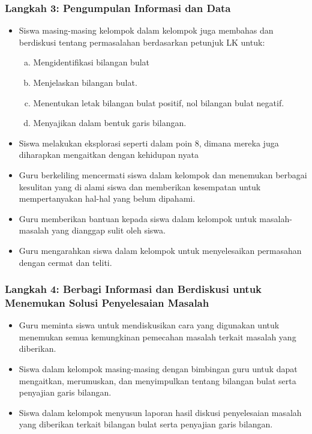 \documentclass[a5paper,10pt,openany]{book}
\begin{document}
\subsubsection{Langkah 3: Pengumpulan Informasi dan Data}
{\color{NavyBlue}
	\begin{itemize}[\faCheckSquare,leftmargin=*,itemsep=-4pt,topsep=2pt]	
		\item Siswa masing-masing kelompok dalam kelompok juga membahas dan berdiskusi tentang permasalahan berdasarkan petunjuk LK untuk:
		\begin{enumerate}[a.,leftmargin=*,itemsep=-4pt,topsep=2pt]
			\item Mengidentifikasi bilangan bulat
			\item Menjelaskan bilangan bulat.
			\item Menentukan letak bilangan bulat positif, nol bilangan bulat negatif.
			\item Menyajikan dalam bentuk garis bilangan.
		\end{enumerate}
		\item Siswa melakukan eksplorasi seperti dalam poin 8, dimana mereka juga diharapkan mengaitkan dengan kehidupan nyata 
		\item Guru berkeliling mencermati siswa dalam kelompok dan menemukan berbagai kesulitan yang di alami siswa dan  memberikan kesempatan untuk mempertanyakan hal-hal yang belum dipahami.
		\item Guru memberikan bantuan kepada siswa dalam kelompok untuk masalah-masalah yang dianggap sulit oleh siswa.
		\item Guru mengarahkan siswa dalam kelompok untuk menyelesaikan permasahan dengan cermat dan teliti.	
	\end{itemize}	
}	
\subsubsection{Langkah 4: Berbagi Informasi dan Berdiskusi untuk Menemukan Solusi Penyelesaian Masalah}
{\color{NavyBlue}
	\begin{itemize}[\faCheckSquare,leftmargin=*,itemsep=-4pt,topsep=2pt]	
	\item Guru meminta siswa untuk mendiskusikan cara yang digunakan untuk menemukan semua kemungkinan pemecahan masalah terkait masalah yang diberikan.
	\item Siswa dalam kelompok masing-masing dengan bimbingan guru untuk dapat mengaitkan, merumuskan, dan menyimpulkan tentang bilangan bulat serta penyajian garis bilangan. 
	\item Siswa dalam kelompok menyusun laporan hasil diskusi penyelesaian masalah yang diberikan terkait bilangan bulat serta penyajian garis bilangan.	
	\end{itemize}	
}	
\newpage
\end{document}
